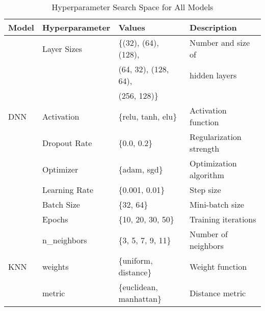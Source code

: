 \documentclass{article}
\begin{document}
\begin{table}[htbp]
    \centering
    \caption{Hyperparameter Search Space for All Models}
    \begin{tabular}{llll}
        \toprule
        \textbf{Model}              & \textbf{Hyperparameter} & \textbf{Values}                                & \textbf{Description}     \\
        \midrule
        \multirow{7}{*}{DNN}        & Layer Sizes             & \{(32), (64), (128),                           & Number and size of       \\
                                    &                         & (64, 32), (128, 64),                           & hidden layers            \\
                                    &                         & (256, 128)\}                                   &                          \\
                                    & Activation              & \{relu, tanh, elu\}                            & Activation function      \\
                                    & Dropout Rate            & \{0.0, 0.2\}                                   & Regularization strength  \\
                                    & Optimizer               & \{adam, sgd\}                                  & Optimization algorithm   \\
                                    & Learning Rate           & \{0.001, 0.01\}                                & Step size                \\
                                    & Batch Size              & \{32, 64\}                                     & Mini-batch size          \\
                                    & Epochs                  & \{10, 20, 30, 50\}                             & Training iterations      \\
        \midrule
        \multirow{5}{*}{KNN}        & n\_neighbors            & \{3, 5, 7, 9, 11\}                             & Number of neighbors      \\
                                    & weights                 & \{uniform, distance\}                          & Weight function          \\
                                    & metric                  & \{euclidean, manhattan\}                       & Distance metric          \\

\end{tabular}
\end{table}
\end{document}
